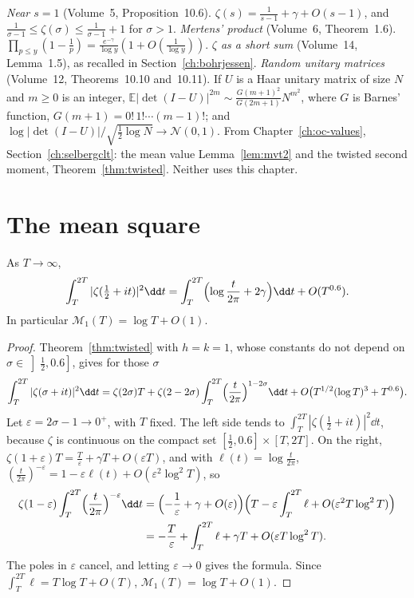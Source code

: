 \begin{reminder}
\emph{Near $s=1$} (Volume~5, Proposition~10.6). $\zeta(s)=\frac1{s-1}+\gamma+O(s-1)$, and $\frac1{\sigma-1}\le\zeta(\sigma)\le\frac1{\sigma-1}+1$ for $\sigma>1$.
\emph{Mertens' product} (Volume~6, Theorem~1.6). $\prod_{p\le y}(1-\frac1p)=\frac{e^{-\gamma}}{\log y}(1+O(\frac1{\log y}))$.
\emph{$\zeta$ as a short sum} (Volume~14, Lemma~1.5), as recalled in Section~\ref{ch:bohrjessen}.
\emph{Random unitary matrices} (Volume~12, Theorems~10.10 and~10.11). If $U$ is a Haar unitary matrix of size $N$ and $m\ge0$ is an integer, $\mathbb E|\det(I-U)|^{2m}\sim\frac{G(m+1)^2}{G(2m+1)}N^{m^2}$, where $G$ is Barnes' function, $G(m+1)=0!\,1!\cdots(m-1)!$; and $\log|\det(I-U)|/\sqrt{\frac12\log N}\to\mathcal N(0,1)$.
From Chapter~\ref{ch:oc-values}, Section~\ref{ch:selbergclt}: the mean value Lemma~\ref{lem:mvt2} and the twisted second moment, Theorem~\ref{thm:twisted}. Neither uses this chapter.
\end{reminder}

\section{The mean square}

\begin{theorem}\label{thm:ingham}
As $T\to\infty$,
\[
\int_T^{2T}|\zeta(\tfrac12+it)|^2\dd t=\int_T^{2T}\Bigl(\log\frac t{2\pi}+2\gamma\Bigr)\dd t+O(T^{0.6}).
\]
In particular $\mathcal M_1(T)=\log T+O(1)$.
\end{theorem}
\begin{proof}
Theorem~\ref{thm:twisted} with $h=k=1$, whose constants do not depend on $\sigma\in\left]\frac12,0.6\right]$, gives for those $\sigma$
\[
\int_T^{2T}|\zeta(\sigma+it)|^2\dd t=\zeta(2\sigma)T+\zeta(2-2\sigma)\int_T^{2T}\Bigl(\frac t{2\pi}\Bigr)^{1-2\sigma}\dd t+O\bigl(T^{1/2}(\log T)^3+T^{0.6}\bigr).
\]
Let $\varepsilon=2\sigma-1\to0^+$, with $T$ fixed. The left side tends to $\int_T^{2T}|\zeta(\frac12+it)|^2\dd t$, because $\zeta$ is continuous on the compact set $[\frac12,0.6]\times[T,2T]$. On the right, $\zeta(1+\varepsilon)T=\frac T\varepsilon+\gamma T+O(\varepsilon T)$, and with $\ell(t)=\log\frac t{2\pi}$, $(\frac t{2\pi})^{-\varepsilon}=1-\varepsilon\ell(t)+O(\varepsilon^2\log^2T)$, so
\[
\begin{aligned}
\zeta(1-\varepsilon)\int_T^{2T}\Bigl(\frac t{2\pi}\Bigr)^{-\varepsilon}\dd t
&=\Bigl(-\frac1\varepsilon+\gamma+O(\varepsilon)\Bigr)\Bigl(T-\varepsilon\int_T^{2T}\ell+O(\varepsilon^2T\log^2T)\Bigr)\\
&=-\frac T\varepsilon+\int_T^{2T}\ell+\gamma T+O(\varepsilon T\log^2T).
\end{aligned}
\]
The poles in $\varepsilon$ cancel, and letting $\varepsilon\to0$ gives the formula. Since $\int_T^{2T}\ell=T\log T+O(T)$, $\mathcal M_1(T)=\log T+O(1)$.
\end{proof}

